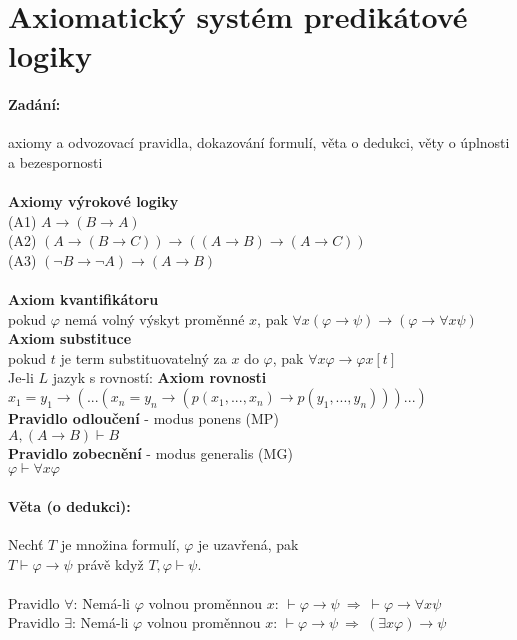 \section{Axiomatický systém predikátové logiky}
% 
\paragraph*{Zadání:}
axiomy a odvozovací pravidla, dokazování formulí, věta o dedukci, věty o úplnosti a bezespornosti\\~\\
%
\textbf{Axiomy výrokové logiky}\\
(A1) $A \rightarrow (B \rightarrow A)$\\
(A2) $(A \rightarrow (B \rightarrow C)) \rightarrow (( A\rightarrow B) \rightarrow (A\rightarrow C)) $\\
(A3) $ (\neg B \rightarrow \neg A) \rightarrow (A\rightarrow B)$\\~\\
%
\textbf{Axiom kvantifikátoru}\\
pokud $\varphi $ nemá volný výskyt proměnné $x$, pak $\forall x (\varphi \rightarrow \psi ) \rightarrow (\varphi \rightarrow \forall x \psi )$\\
%
\textbf{Axiom substituce}\\
pokud $t$ je term substituovatelný za $x$ do $\varphi $, pak $\forall x \varphi \rightarrow \varphi x [t]$\\
%
Je-li $L$ jazyk s rovností: \textbf{Axiom rovnosti}\\
$x_1 = y_1 \rightarrow ( ... (x_n = y_n \rightarrow (p(x_1,...,x_n)\rightarrow p(y_1,...,y_n))) ... )$\\
%
\textbf{Pravidlo odloučení} - modus ponens (MP)\\
$A, (A \rightarrow B) \vdash B$\\
%
\textbf{Pravidlo zobecnění} - modus generalis (MG)\\
$\varphi \vdash \forall x \varphi $

\paragraph*{Věta (o dedukci):}
Nechť $T$ je množina formulí, $\varphi $ je uzavřená, pak\\
$T \vdash \varphi \rightarrow \psi$ právě když $T, \varphi \vdash \psi$.\\~\\
%
Pravidlo $\forall $: Nemá-li $\varphi $ volnou proměnnou $x$: $\vdash \varphi \rightarrow \psi ~ \Rightarrow ~ \vdash \varphi \rightarrow \forall x \psi $\\
%
Pravidlo $\exists $: Nemá-li $\varphi $ volnou proměnnou $x$: $\vdash \varphi \rightarrow \psi ~ \Rightarrow ~ (\exists x \varphi ) \rightarrow \psi $

